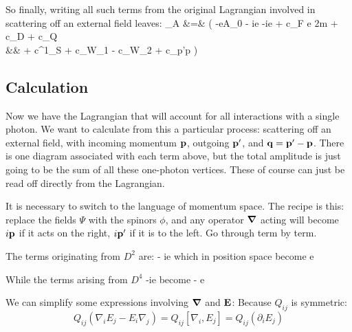 So finally, writing all such terms from the original Lagrangian involved in scattering off an external field leaves:
\small
\beqa
{}_A &=& \fnrb (  -eA_0 - ie   -ie  
		+ c_F e  {2m}   	
		+ c_D 	
		+ c_Q 	
	\\&&	+ c^{1}_S 
		+ c_{W_1} 	
		- c_{W_2} 
		+ c_{p'p} \frac{ e [ (\v{S} \smalldot \v{\grad}) (\v{B} \smalldot \v{\grad}) + (\v{B} \smalldot \v{\grad})(\v{S} \smalldot \v{\grad}) }{8m^3} \big )\fnr
\eeqa
\normalsize


\subsection{Calculation}



Now we have the Lagrangian that will account for all interactions with a single photon.  We want to calculate from this a particular process: scattering off an external field, with incoming momentum $\mathbf{p}$, outgoing $\mathbf{p'}$, and $\mathbf{q} = \mathbf{p'} - \mathbf{p}$.  There is one diagram associated with each term above, but the total amplitude is just going to be the sum of all these one-photon vertices.  These of course can just be read off directly from the Lagrangian.

It is necessary to switch to the language of momentum space.  The recipe is this: replace the fields $\Psi$ with the spinors $\phi$, and any operator $\grad$ acting will become $i\mathbf{p}$ if it acts on the right, $i\mathbf{p'}$ if it is to the left.  Go through term by term.

The terms originating from $D^2$ are:
\beq
	- ie   
\eeq
which in position space become
\beq
	e  
\eeq

While the terms arising from $D^4$
\beq
-ie  
\eeq
become
\beq
- e  
\eeq


We can simplify some expressions involving $\grad$ and $\mathbf{E}$:
Because $Q_{ij}$ is symmetric:
\[
	 Q_{ij} (\nabla_i E_j - E_i \nabla_j ) = Q_{ij} [\nabla_i, E_j] = Q_{ij} (\partial_i E_j)
\]

